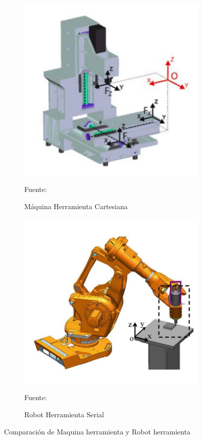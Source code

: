 \begin{figure}[ht!]
    \centering
    \begin{subfigure}{0.45\textwidth}
        \centering
        \includegraphics[width=0.8\linewidth]{Cap2_DisenoEspecificaciones/Figura/CartesianMachiningTool.pdf}
        \caption{Máquina Herramienta Cartesiana}{Fuente:\citep{szipka2018measurement}}
        \label{fig:CartesianMachiningTool}
    \end{subfigure}
     \begin{subfigure}{0.45\textwidth}
        \centering
        \includegraphics[width=0.8\linewidth]{Cap2_DisenoEspecificaciones/Figura/MachiningSerialRobot.pdf}
        \caption{Robot Herramienta Serial}{Fuente:\citep{mejri2016dynamic}}
        \label{fig:MachiningSerialRobot}
    \end{subfigure}
    \caption{Comparación de Maquina herramienta y Robot herramienta}
\end{figure}

